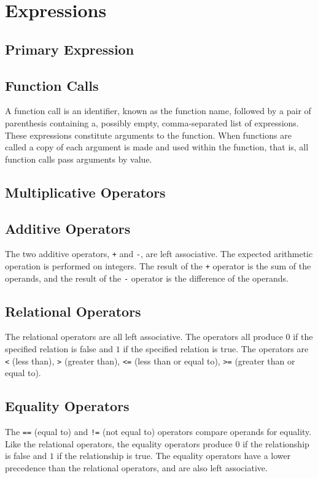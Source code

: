 \documentclass[letterpaper]{article}
\begin{document}
\section{Expressions}
\label{sec:expressions}

\subsection{Primary Expression}

\subsection{Function Calls}
A function call is an identifier, known as the function name, followed by a pair of parenthesis containing a, possibly empty, comma-separated list of expressions.  These expressions constitute arguments to the function.  When functions are called a copy of each argument is made and used within the function, that is, all function calls pass arguments by value.

\subsection{Multiplicative Operators}

\subsection{Additive Operators}
The two additive operators, \texttt{+} and \texttt{-}, are left associative.  The expected arithmetic operation is performed on integers.  The result of the \texttt{+} operator is the sum of the operands, and the result of the \texttt{-} operator is the difference of the operands.


\subsection{Relational Operators}
The relational operators are all left associative.  The operators all produce $0$ if the specified relation is false and $1$ if the specified relation is true.  The operators are \texttt{<} (less than), \texttt{>} (greater than), \texttt{<=} (less than or equal to), \texttt{>=} (greater than or equal to).

\subsection{Equality Operators}
The \texttt{==} (equal to) and \texttt{!=} (not equal to) operators compare operands for equality.  Like the relational operators, the equality operators produce $0$ if the relationship is false and $1$ if the relationship is true.  The equality operators have a lower precedence than the relational operators, and are also left associative.
\end{document}
